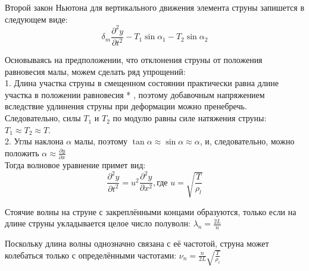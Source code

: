 \documentclass[a4paper, 12pt]{article}%
\begin{document}
	Второй закон Ньютона для вертикального движения элемента струны запишется в следующем виде: 
	$$\delta_m \frac{\partial^2 y}{\partial t^2} - T_1 \sin{\alpha_1} - T_2\sin{\alpha_2} $$

	Основываясь на предположении, что отклонения струны от положения
	равновесия малы, можем сделать ряд упрощений:\\ 
	1. Длина участка струны в смещенном состоянии практически равна
	длине участка в положении равновесия * , поэтому добавочным
	напряжением вследствие удлинения струны при деформации можно пренебречь. Следовательно, силы $T_1$ и $T_2$ по модулю равны силе
	натяжения струны: $T_1 \approx T_2 \approx T$.\\ 
	2. Углы наклона $\alpha$ малы, поэтому $\tan{\alpha} \approx \sin{\alpha} \approx \alpha$, и, следовательно,
	можно положить $\alpha \approx \frac{\partial y}{\partial x}$\\
	
	Тогда волновое уравнение примет вид:
	$$ \frac{\partial^2 y}{\partial t^2} = u^2 \frac{\partial^2 y}{\partial x^2}, 	           \text{где  }  u = \sqrt{\frac{T}{\rho_l}} $$
	
	Стоячие волны на струне с закреплёнными концами образуются, только если на длине струны укладывается целое число полуволн: $ \lambda_n = \frac {2L}{n} $
	
	Поскольку длина волны однозначно связана с её частотой, струна может
	колебаться только с определёнными частотами: $\nu_n = \frac{n}{2L} \sqrt{\frac{T}{\rho_l}}$
\end{document}
